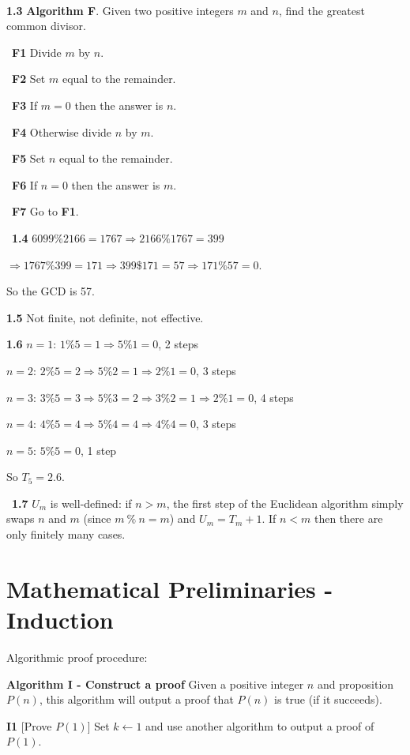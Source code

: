\documentclass{article}
\begin{document}
\

\textbf{1.3} \textbf{Algorithm F}. Given two positive integers $m$ and $n$, find the greatest common divisor.

\ \textbf{F1} Divide $m$ by $n$.

\ \textbf{F2} Set $m$ equal to the remainder.

\ \textbf{F3} If $m=0$ then the answer is $n$.

\ \textbf{F4} Otherwise divide $n$ by $m$.

\ \textbf{F5} Set $n$ equal to the remainder.

\ \textbf{F6} If $n=0$ then the answer is $m$.

\ \textbf{F7} Go to \textbf{F1}.

\
\textbf{1.4} $6099 \% 2166 = 1767 \Rightarrow 2166 \% 1767 = 399$

$\Rightarrow 1767 \%  399 = 171 \Rightarrow 399 \$ 171 = 57 \Rightarrow 171 \% 57 = 0$.

So the GCD is 57.
\

\textbf{1.5} Not finite, not definite, not effective.

\textbf{1.6}
$n=1$: $1 \% 5 = 1 \Rightarrow 5 \% 1 = 0$, 2 steps 

$n=2$: $2 \% 5 = 2 \Rightarrow 5 \% 2 = 1 \Rightarrow 2 \% 1 = 0$, 3 steps

$n=3$: $3 \% 5 = 3 \Rightarrow 5 \% 3 = 2 \Rightarrow 3 \% 2 = 1 \Rightarrow 2 \%1 = 0$, 4 steps

$n=4$: $4 \% 5 = 4 \Rightarrow 5 \% 4 = 4 \Rightarrow 4 \% 4 = 0$, 3 steps 

$n=5$: $5 \% 5 = 0$, 1 step

So $T_5 = 2.6$.

\
\textbf{1.7} $U_m$ is well-defined: if $n > m$, the first step of the Euclidean algorithm simply swaps $n$ and $m$ (since $m\ \%\ n = m$) and $U_m = T_m + 1$. If $n < m$ then there are only finitely many cases.


\section{Mathematical Preliminaries - Induction}

Algorithmic proof procedure:

\textbf{Algorithm I - Construct a proof} Given a positive integer $n$ and proposition $P(n)$, this algorithm will output a proof that $P(n)$ is true (if it succeeds).

\textbf{I1} [Prove $P(1)$] Set $k \leftarrow 1$ and use another algorithm to output a proof of $P(1)$.
\end{document}
